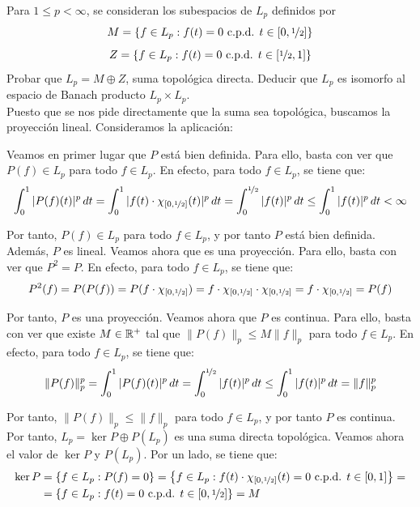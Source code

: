 \begin{ejercicio}
Para $1 \leq p < \infty$, se consideran los subespacios de $L_p$ definidos por
\[
M = \left\{f \in L_p : f(t) = 0 \text{ c.p.d. } t \in \left[0, \nicefrac{1}{2}\right]\right\}
\]
\[
Z = \left\{f \in L_p : f(t) = 0 \text{ c.p.d. } t \in \left[\nicefrac{1}{2}, 1\right]\right\}
\]
Probar que $L_p = M \oplus Z$, suma topológica directa. Deducir que $L_p$ es isomorfo al espacio de Banach producto $L_p \times L_p$.\\

    Puesto que se nos pide directamente que la suma sea topológica, buscamos la proyección lineal. Consideramos la aplicación:

    Veamos en primer lugar que $P$ está bien definida. Para ello, basta con ver que $P(f) \in L_p$ para todo $f \in L_p$. En efecto, para todo $f \in L_p$, se tiene que:
    \begin{align*}
        \int_{0}^1 |P(f)(t)|^p\,dt = \int_{0}^1 |f(t)\cdot \chi_{[0, \nicefrac{1}{2}]}(t)|^p\,dt = \int_{0}^{\nicefrac{1}{2}} |f(t)|^p\,dt \leq \int_{0}^{1} |f(t)|^p\,dt < \infty
    \end{align*}

    Por tanto, $P(f) \in L_p$ para todo $f \in L_p$, y por tanto $P$ está bien definida. Además, $P$ es lineal. Veamos ahora que es una proyección. Para ello, basta con ver que $P^2 = P$. En efecto, para todo $f \in L_p$, se tiene que:
    \begin{align*}
        P^2(f) = P(P(f)) = P(f\cdot \chi_{[0, \nicefrac{1}{2}]}) = f\cdot \chi_{[0, \nicefrac{1}{2}]}\cdot \chi_{[0, \nicefrac{1}{2}]} = f\cdot \chi_{[0, \nicefrac{1}{2}]} = P(f)
    \end{align*}

    Por tanto, $P$ es una proyección. Veamos ahora que $P$ es continua. Para ello, basta con ver que existe $M \in \mathbb{R}^+$ tal que $\|P(f)\|_p \leq M \|f\|_p$ para todo $f \in L_p$. En efecto, para todo $f \in L_p$, se tiene que:
    \begin{align*}
        \|P(f)\|_p^p = \int_{0}^1 |P(f)(t)|^p\,dt = \int_{0}^{\nicefrac{1}{2}} |f(t)|^p\,dt \leq \int_{0}^{1} |f(t)|^p\,dt = \|f\|_p^p
    \end{align*}

    Por tanto, $\|P(f)\|_p \leq \|f\|_p$ para todo $f \in L_p$, y por tanto $P$ es continua. Por tanto, $L_p = \ker P \oplus P(L_p)$ es una suma directa topológica. Veamos ahora el valor de $\ker P$ y $P(L_p)$. Por un lado, se tiene que:
    \begin{align*}
        \ker P &= \left\{f \in L_p : P(f) = 0\right\} = \left\{f \in L_p : f(t)\cdot \chi_{[0, \nicefrac{1}{2}]}(t) = 0 \text{ c.p.d. } t \in [0, 1]\right\} =\\&= \left\{f \in L_p : f(t) = 0 \text{ c.p.d. } t \in [0, \nicefrac{1}{2}]\right\} = M
    \end{align*}


\end{ejercicio}

